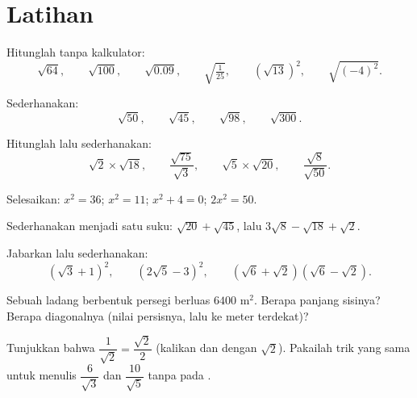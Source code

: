 \section{Latihan}

\begin{exercise}[$\star$]\label{exo:g9:sqrt:1}
Hitunglah tanpa kalkulator:
\[
\sqrt{64}, \qquad \sqrt{100}, \qquad \sqrt{0.09}, \qquad
\sqrt{\tfrac{1}{25}}, \qquad \left(\sqrt{13}\right)^2, \qquad
\sqrt{(-4)^2} .
\]
\end{exercise}

\begin{exercise}[$\star$]\label{exo:g9:sqrt:2}
Sederhanakan:
\[
\sqrt{50}, \qquad \sqrt{45}, \qquad \sqrt{98}, \qquad \sqrt{300} .
\]
\end{exercise}

\begin{exercise}[$\star$]\label{exo:g9:sqrt:3}
Hitunglah lalu sederhanakan:
\[
\sqrt2 \times \sqrt{18}, \qquad
\frac{\sqrt{75}}{\sqrt3}, \qquad
\sqrt5 \times \sqrt{20}, \qquad
\frac{\sqrt{8}}{\sqrt{50}} .
\]
\end{exercise}

\begin{exercise}[$\star$]\label{exo:g9:sqrt:4}
Selesaikan: $x^2 = 36$; \quad $x^2 = 11$; \quad $x^2 + 4 = 0$; \quad
$2x^2 = 50$.
\end{exercise}

\begin{exercise}[$\star$]\label{exo:g9:sqrt:5}
Sederhanakan menjadi satu suku: $\sqrt{20} + \sqrt{45}$, lalu
$3\sqrt8 - \sqrt{18} + \sqrt2$.
\end{exercise}

\begin{exercise}[$\star\star$]\label{exo:g9:sqrt:6}
Jabarkan lalu sederhanakan:
\[
\left(\sqrt3 + 1\right)^2, \qquad
\left(2\sqrt5 - 3\right)^2, \qquad
\left(\sqrt6 + \sqrt2\right)\left(\sqrt6 - \sqrt2\right).
\]
\end{exercise}

\begin{exercise}[$\star\star$]\label{exo:g9:sqrt:7}
Sebuah ladang berbentuk persegi berluas $6400$ m$^2$. Berapa panjang
sisinya? Berapa diagonalnya (nilai persisnya, lalu  ke meter
terdekat)?
\end{exercise}

\begin{exercise}[$\star\star$]\label{exo:g9:sqrt:8}
Tunjukkan bahwa $\dfrac{1}{\sqrt2} = \dfrac{\sqrt2}{2}$ (kalikan
 dan  dengan $\sqrt2$). Pakailah trik yang sama
untuk menulis $\dfrac{6}{\sqrt3}$ dan $\dfrac{10}{\sqrt5}$ tanpa  pada .
\end{exercise}

